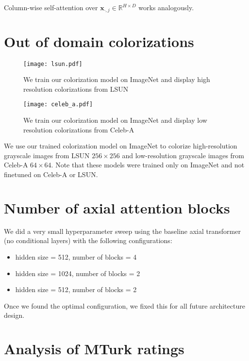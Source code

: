 \documentclass{article} \usepackage{iclr2021_conference,times}
\newcommand{\bb}[1]{\mathbf{#1}}
\newcommand{\bx}{\bb{x}}
\begin{document}
Column-wise self-attention over $\bx_{\cdot, j} \in \mathbb{R}^{H {\times} D}$ works analogously.



\section{Out of domain colorizations}

\begin{figure*}
\centering
\texttt{[image: lsun.pdf]}
\caption{We train our colorization model on ImageNet and display high resolution colorizations from LSUN}
\label{fig:lsun}
\end{figure*}

\begin{figure*}
\centering
\texttt{[image: celeb\_a.pdf]}
\caption{We train our colorization model on ImageNet and display low resolution colorizations from Celeb-A}
\label{fig:celeb_a}
\end{figure*}


We use our trained colorization model on ImageNet to colorize high-resolution grayscale images from LSUN $256 \times 256$ \citep{yu2015lsun} and low-resolution grayscale images from Celeb-A \citep{liu2015deep} $64 \times 64$. Note that these models were trained only on ImageNet and not finetuned on Celeb-A or LSUN.



\section{Number of axial attention blocks}

We did a very small hyperparameter sweep using the baseline axial transformer (no conditional layers) with the following configurations:

\begin{itemize}
    \item hidden size = 512, number of blocks = 4
    \item hidden size = 1024, number of blocks = 2
    \item hidden size = 512, number of blocks = 2
\end{itemize}

Once we found the optimal configuration, we fixed this for all future architecture design.




\section{Analysis of MTurk ratings}
\end{document}
